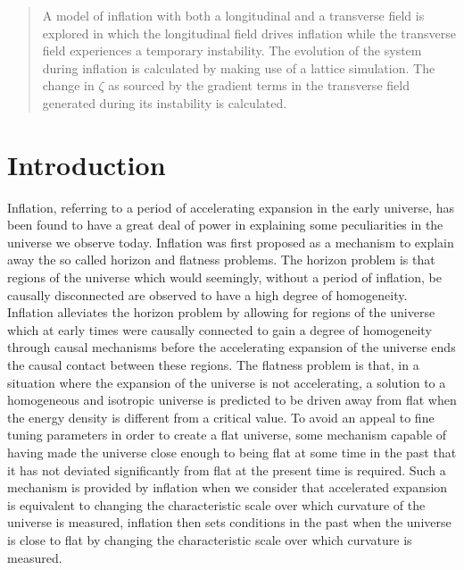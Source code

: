 \documentclass[letterpaper,11pt]{article}
\begin{document}
\begin{abstract}
A model of inflation with both a longitudinal and a transverse field is explored in which the longitudinal field drives inflation while the transverse field experiences a temporary instability. The evolution of the system during inflation is calculated by making use of a lattice simulation. The change in $\zeta$ as sourced by the gradient terms in the transverse field generated during its instability is calculated.
\end{abstract}
\section{Introduction}
Inflation, referring to a period of accelerating expansion in the early universe, has been found to have a great deal of power in explaining some peculiarities in the universe we observe today.
Inflation was first proposed as a mechanism to explain away the so called horizon and flatness problems.%
The horizon problem is that regions of the universe which would seemingly, without a period of inflation, be causally disconnected are observed to have a high degree of homogeneity.%
Inflation alleviates the horizon problem by allowing for regions of the universe which at early times were causally connected to gain a degree of homogeneity through causal mechanisms before the accelerating expansion of the universe ends the causal contact between these regions. The flatness problem is that, in a situation where the expansion of the universe is not accelerating, a solution to a homogeneous and isotropic universe is predicted to be driven away from flat when the energy density is different from a critical value. To avoid an appeal to fine tuning parameters in order to create a flat universe, some mechanism capable of having made the universe close enough to being flat at some time in the past that it has not deviated significantly from flat at the present time is required. Such a mechanism is provided by inflation when we consider that accelerated expansion is equivalent to changing the characteristic scale over which curvature of the universe is measured, inflation then sets conditions in the past when the universe is close to flat by changing the characteristic scale over which curvature is measured.
\end{document}
